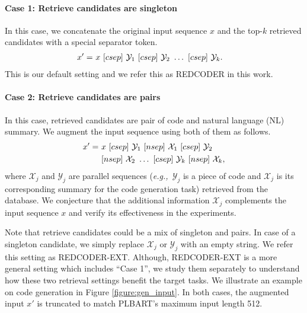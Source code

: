 \documentclass[11pt]{article}
\newcommand{\tool}{{REDCODER}\xspace}
\newcommand{\toolext}{{REDCODER-EXT}\xspace}
\newcommand{\toolextnospace}{REDCODER-EXT}
\newcommand{\eg}{\textit{e.g.,}~}
\begin{document}
\paragraph{Case 1: Retrieve candidates are singleton} In this case, we concatenate the original input sequence $x$ and the top-$k$ retrieved candidates with a special separator token.
\begin{equation*}
\setlength{\belowdisplayskip}{5pt}
\setlength{\abovedisplayskip}{5pt}
\label{eq:common}
 \begin{split}
    x' =& \ x\  [csep] \ \mathcal{Y}_{1} \ [csep] \ \mathcal{Y}_{2} \ \ldots \ [csep] \ \mathcal{Y}_{k}.
 \end{split}
\end{equation*}
This is our default setting and we refer this as \tool in this work.




\paragraph{Case 2: Retrieve candidates are pairs} In this case, retrieved candidates are pair of code and natural language (NL) summary. We augment the input sequence using both of them as follows.
\begin{equation*}
\setlength{\belowdisplayskip}{5pt}
\setlength{\abovedisplayskip}{5pt}
\label{eq:common}
    \begin{split}
        x' =& 
        \ x \ [csep] \ \mathcal{Y}_{1} \ [nsep] \ \mathcal{X}_{1} \ [csep] \ \mathcal{Y}_{2} \\
        & \ [nsep] \ \mathcal{X}_{2} \ \ldots \ [csep] \ \mathcal{Y}_{k} \ [nsep] \ \mathcal{X}_{k},
    \end{split}
\end{equation*}
where $\mathcal{X}_{j}$ and $\mathcal{Y}_{j}$ are parallel sequences (\eg $\mathcal{Y}_{j}$ is a piece of code and $\mathcal{X}_{j}$ is its corresponding summary for the code generation task) retrieved from the database.
We conjecture that the additional information $\mathcal{X}_{j}$ complements the input sequence $x$ and verify its effectiveness in the experiments.


Note that retrieve candidates could be a mix of singleton and pairs. In case of a singleton candidate, we simply replace $\mathcal{X}_{j}$
or $\mathcal{Y}_{j}$ 
with an empty string.
We refer this setting as \toolextnospace. 
Although, \toolext is a more general setting which includes ``Case 1'', we study them separately to understand how these two retrieval settings benefit the target tasks.
We illustrate an example on code generation in Figure \ref{figure:gen_input}.
In both cases, the augmented input $x'$
is truncated to match PLBART's maximum input length 512.
\end{document}
